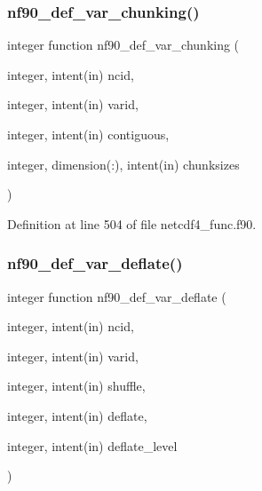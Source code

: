 \mbox{\label{netcdf4__func_8f90_a80e250c30ed7621fedec01bc2eb00a59}} 
\subsubsection{\texorpdfstring{nf90\+\_\+def\+\_\+var\+\_\+chunking()}{nf90\_def\_var\_chunking()}}
{\footnotesize\ttfamily integer function nf90\+\_\+def\+\_\+var\+\_\+chunking (\begin{DoxyParamCaption}\item[{integer, intent(in)}]{ncid,  }\item[{integer, intent(in)}]{varid,  }\item[{integer, intent(in)}]{contiguous,  }\item[{integer, dimension(\+:), intent(in)}]{chunksizes }\end{DoxyParamCaption})}



Definition at line 504 of file netcdf4\+\_\+func.\+f90.

\mbox{\label{netcdf4__func_8f90_a1385c805e7cd4afb12ce626f6cea1a22}} 
\subsubsection{\texorpdfstring{nf90\+\_\+def\+\_\+var\+\_\+deflate()}{nf90\_def\_var\_deflate()}}
{\footnotesize\ttfamily integer function nf90\+\_\+def\+\_\+var\+\_\+deflate (\begin{DoxyParamCaption}\item[{integer, intent(in)}]{ncid,  }\item[{integer, intent(in)}]{varid,  }\item[{integer, intent(in)}]{shuffle,  }\item[{integer, intent(in)}]{deflate,  }\item[{integer, intent(in)}]{deflate\+\_\+level }\end{DoxyParamCaption})}



